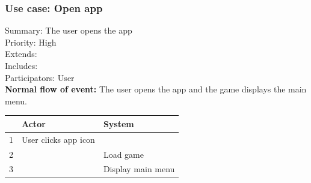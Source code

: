 \documentclass{article}
\begin{document}
\subsubsection{Use case: Open app}
Summary: The user opens the app\\
Priority: High\\
Extends:\\
Includes:\\
Participators: User\\
\textbf{Normal flow of event:} The user opens the app and the game displays the main menu.
\vspace{1 mm}\\
\begin{tabular}{|c|l|l|} \hline
  & Actor & System \\ \hline
1 & User clicks app icon & \\ \hline
2 & & Load game \\ \hline
3 & & Display main menu \\ \hline
\end{tabular}\\
\vspace{5 mm}
\end{document}
